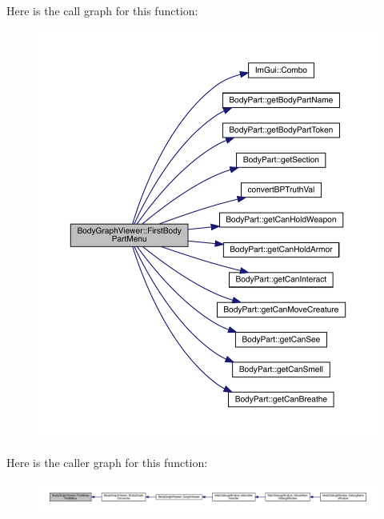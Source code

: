 Here is the call graph for this function\+:
\nopagebreak
\begin{figure}[H]
\begin{center}
\leavevmode
\includegraphics[width=350pt]{df/d9e/namespace_body_graph_viewer_a7a0ddd4c8da17a236fb1b160d43d6c72_cgraph}
\end{center}
\end{figure}
Here is the caller graph for this function\+:
\nopagebreak
\begin{figure}[H]
\begin{center}
\leavevmode
\includegraphics[width=350pt]{df/d9e/namespace_body_graph_viewer_a7a0ddd4c8da17a236fb1b160d43d6c72_icgraph}
\end{center}
\end{figure}
\mbox{\label{namespace_body_graph_viewer_af9dda6b999602264957b77351415c57d}} 
